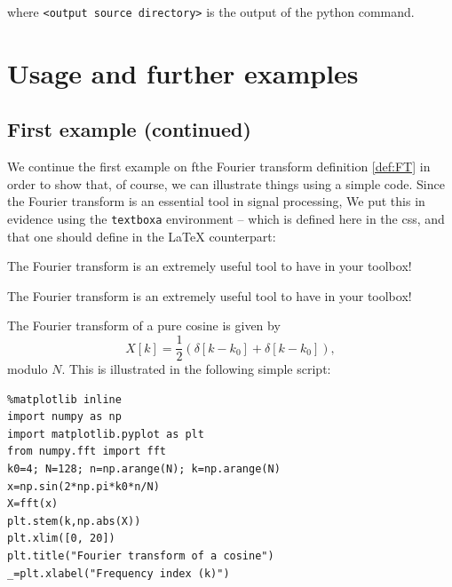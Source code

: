 where \texttt{\textless{}output\ source\ directory\textgreater{}} is the
output of the python command.

    \section{Usage and further examples}\label{usage-and-further-examples}

    \subsection{First example (continued)}\label{first-example-continued}

    We continue the first example on fthe Fourier transform definition
\ref{def:FT} in order to show that, of course, we can illustrate things
using a simple code. Since the Fourier transform is an essential tool in
signal processing, We put this in evidence using the \texttt{textboxa}
environment -- which is defined here in the css, and that one should
define in the LaTeX counterpart:

\begin{listing}
\begin{textboxa}
The Fourier transform is an extremely useful tool to have in your toolbox!
\end{textboxa}
\end{listing}

    \begin{textboxa}
The Fourier transform is an extremely useful tool to have in your toolbox!
\end{textboxa}

    The Fourier transform of a pure cosine is given by \[
X[k] = \frac{1}{2} \left( \delta[k-k_0] + \delta[k-k_0] \right), 
\] modulo \(N\). This is illustrated in the following simple script:
\begin{lstlisting}
%matplotlib inline
import numpy as np
import matplotlib.pyplot as plt 
from numpy.fft import fft
k0=4; N=128; n=np.arange(N); k=np.arange(N)
x=np.sin(2*np.pi*k0*n/N)
X=fft(x)
plt.stem(k,np.abs(X))
plt.xlim([0, 20])
plt.title("Fourier transform of a cosine")
_=plt.xlabel("Frequency index (k)")
\end{lstlisting}%
%
    \begin{center}
    \end{center}
    

